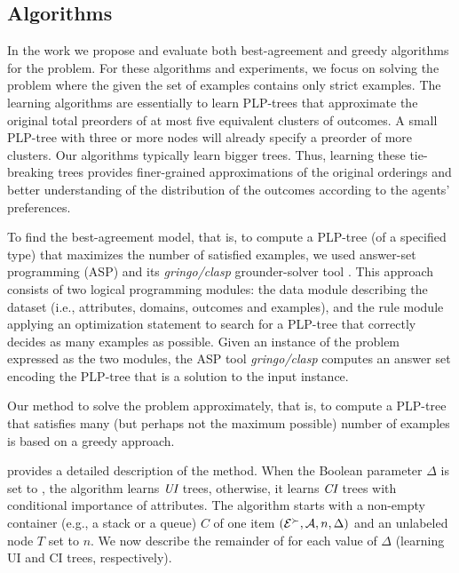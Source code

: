 \subsection{Algorithms}
\label{sec:algs}
In the work we propose and evaluate both best-agreement and 
greedy algorithms for the  problem. 
For these algorithms and experiments, we focus on solving the
 problem where the given the set of examples
contains only strict examples.
The learning algorithms are essentially to learn PLP-trees that
approximate the original total preorders of at most five
equivalent clusters of outcomes.
A small PLP-tree with three or more nodes will already specify
a preorder of more clusters.
Our algorithms typically learn bigger trees.
Thus, learning these tie-breaking trees provides finer-grained
approximations of the original orderings and better
understanding of the distribution of the outcomes according
to the agents' preferences.

To find the best-agreement model, that is, to
compute a PLP-tree (of a specified type) that maximizes the number of 
satisfied examples, we used answer-set programming (ASP)
\cite{marek1999stable,niemela1999logic} and its \emph{gringo/clasp}
grounder-solver tool \cite{gebser2011potassco}.
This approach consists of two logical programming modules: 
the data module
describing the dataset (i.e., attributes, domains, outcomes and examples),
and the rule module applying an optimization statement to search for
a PLP-tree that correctly decides as many examples as possible.
Given an instance of the  problem expressed as the two modules,
the ASP tool \emph{gringo/clasp} computes an answer set encoding the PLP-tree
that is a solution to the input instance.

Our method to solve the  problem approximately, that is, to 
compute a PLP-tree that satisfies many (but perhaps not the maximum
possible) number of examples is based on a greedy approach.

 provides a detailed description of the method. When
the Boolean parameter $\Delta$ is set to , the algorithm learns $\textit{UI}$ 
trees, otherwise, it learns $\textit{CI}$ trees with conditional importance of attributes. 
The algorithm starts with a non-empty container (e.g., a stack or a queue) $C$
of one item $(\mathcal{E}^\succ,\mathcal{A},n,\Delta)$ and an unlabeled node $T$ set to $n$.
We now describe the remainder of  for each value of
$\Delta$ (learning UI and CI trees, respectively).

